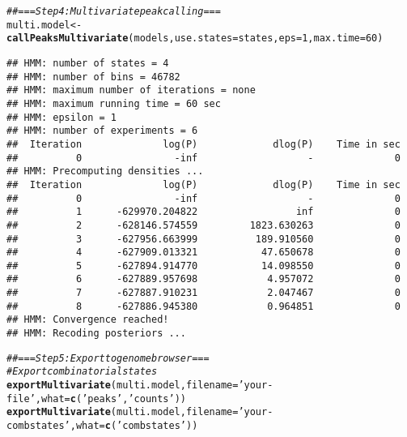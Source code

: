 \documentclass[11pt]{article}\usepackage[]{graphicx}\usepackage[]{color}
\makeatletter
\newcommand{\hlnum}[1]{\textcolor[rgb]{0.686,0.059,0.569}{#1}}%
\newcommand{\hlstr}[1]{\textcolor[rgb]{0.192,0.494,0.8}{#1}}%
\newcommand{\hlcom}[1]{\textcolor[rgb]{0.678,0.584,0.686}{\textit{#1}}}%
\newcommand{\hlstd}[1]{\textcolor[rgb]{0.345,0.345,0.345}{#1}}%
\newcommand{\hlkwb}[1]{\textcolor[rgb]{0.69,0.353,0.396}{#1}}%
\newcommand{\hlkwc}[1]{\textcolor[rgb]{0.333,0.667,0.333}{#1}}%
\newcommand{\hlkwd}[1]{\textcolor[rgb]{0.737,0.353,0.396}{\textbf{#1}}}%
\newenvironment{kframe}{%
 \def\at@end@of@kframe{}%
 \ifinner\ifhmode%
  \def\at@end@of@kframe{\end{minipage}}%
  \begin{minipage}{\columnwidth}%
 \fi\fi%
 \def\FrameCommand##1{\hskip\@totalleftmargin \hskip-\fboxsep
 \colorbox{shadecolor}{##1}\hskip-\fboxsep
     \hskip-\linewidth \hskip-\@totalleftmargin \hskip\columnwidth}%
 \MakeFramed {\advance\hsize-\width
   \@totalleftmargin\z@ \linewidth\hsize
   \@setminipage}}%
 {\par\unskip\endMakeFramed%
 \at@end@of@kframe}
\newenvironment{knitrout}{}{} %
\makeatother
\begin{document}
\begin{scriptsize}
\begin{knitrout}
\color{fgcolor}\begin{kframe}
\begin{alltt}
\hlcom{## === Step 4: Multivariate peak calling ===}
\hlstd{multi.model} \hlkwb{<-} \hlkwd{callPeaksMultivariate}\hlstd{(models,} \hlkwc{use.states}\hlstd{=states,} \hlkwc{eps}\hlstd{=}\hlnum{1}\hlstd{,} \hlkwc{max.time}\hlstd{=}\hlnum{60}\hlstd{)}
\end{alltt}
\begin{verbatim}
## HMM: number of states = 4
## HMM: number of bins = 46782
## HMM: maximum number of iterations = none
## HMM: maximum running time = 60 sec
## HMM: epsilon = 1
## HMM: number of experiments = 6
##  Iteration              log(P)             dlog(P)    Time in sec
##          0                -inf                   -              0
## HMM: Precomputing densities ...
##  Iteration              log(P)             dlog(P)    Time in sec
##          0                -inf                   -              0
##          1      -629970.204822                 inf              0
##          2      -628146.574559         1823.630263              0
##          3      -627956.663999          189.910560              0
##          4      -627909.013321           47.650678              0
##          5      -627894.914770           14.098550              0
##          6      -627889.957698            4.957072              0
##          7      -627887.910231            2.047467              0
##          8      -627886.945380            0.964851              0
## HMM: Convergence reached!
## HMM: Recoding posteriors ...
\end{verbatim}
\end{kframe}
\end{knitrout}

\begin{knitrout}
\color{fgcolor}\begin{kframe}
\begin{alltt}
\hlcom{## === Step 5: Export to genome browser ===}
\hlcom{# Export combinatorial states}
\hlkwd{exportMultivariate}\hlstd{(multi.model,} \hlkwc{filename}\hlstd{=}\hlstr{'your-file'}\hlstd{,} \hlkwc{what}\hlstd{=}\hlkwd{c}\hlstd{(}\hlstr{'peaks'}\hlstd{,}\hlstr{'counts'}\hlstd{))}
\hlkwd{exportMultivariate}\hlstd{(multi.model,} \hlkwc{filename}\hlstd{=}\hlstr{'your-combstates'}\hlstd{,} \hlkwc{what}\hlstd{=}\hlkwd{c}\hlstd{(}\hlstr{'combstates'}\hlstd{))}
\end{alltt}
\end{kframe}
\end{knitrout}


\end{scriptsize}
\end{document}
